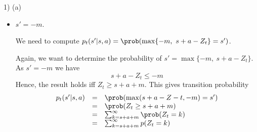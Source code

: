 \documentclass[11pt,a4paper]{article}
\begin{document}
\begin{answer}{1) (a)}
\begin{itemize}
\begin{itemize}
      \item $s'=-m$.
      \par We need to compute $p_t(s'|s,a)=\prob(\max\{-m,\ s+a-Z_t\}=s')$.
      \par Again, we want to determine the probability of $s'=\max\{-m,\ s+a-Z_t\}$. As $s'=-m$ we have
      \[ s+a-Z_t\leq-m \]
      Hence, the result holds iff $Z_t\geq s+a+m$. This gives transition probability
      \[\begin{array}{rcl}
        p_t(s'|s,a)&=&\prob(\max(s+a-Z-t,-m)=s')\\
        &=&\prob(Z_t\geq s+a+m)\\
        &=&\sum_{k=s+a+m}^\infty\prob(Z_t=k)\\
        &=&\sum_{k=s+a+m}^\infty p(Z_t=k)
      \end{array}\]
    \end{itemize}


\end{itemize}
\end{answer}
\end{document}
